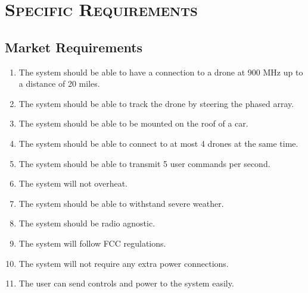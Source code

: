 \documentclass[ProjectRequirements.tex]{subfiles}
\begin{document}
\bigskip
\pagebreak
\section{\textsc{\Large Specific Requirements}}
	\subsection{Market Requirements}
	\begin{enumerate}%
		\item The system should be able to have a connection to a drone at 900 MHz up to a distance of 20 miles.
		\item The system should be able to track the drone by steering the phased array.
		\item The system should be able to be mounted on the roof of a car.
		\item The system should be able to connect to at most 4 drones at the same time.
		\item The system should be able to transmit 5 user commands per second.
		\item The system will not overheat.
		\item The system should be able to withstand severe weather.
		\item The system should be radio agnostic.
		\item The system will follow FCC regulations.
		\item The system will not require any extra power connections.
		\item The user can send controls and power to the system easily.
	\end{enumerate}
\end{document}
